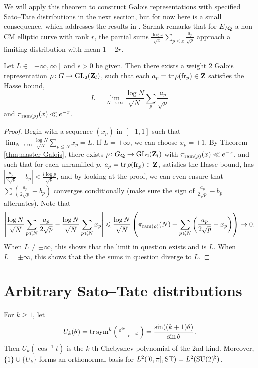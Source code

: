 We will apply this theorem to construct Galois representations with specified 
Sato--Tate distributions in the next section, but for now here is a small 
consequence, which addresses the results in \cite{sarnak-2007}. Sarnak remarks 
that for $E_{/\mathbf{Q}}$ a non-CM elliptic curve with rank $r$, the partial sums 
$\frac{\log x}{\sqrt x} \sum_{p\leqslant x} \frac{a_p}{\sqrt p}$ approach a 
limiting distribution with mean $1 - 2 r$. 

\begin{corollary}
Let $L \in [-\infty,\infty]$ and $\epsilon>0$ be given. Then there exists a 
weight 2 Galois representation $\rho\colon G\to \operatorname{GL}_2(\mathbf{Z}_l)$, such that 
each $a_p = \operatorname{tr}\rho(\mathrm{fr}_p)\in \mathbf{Z}$ satisfies the Hasse bound, 
\[
	L = \lim_{N\to \infty} \frac{\log N}{\sqrt N}\sum_p \frac{a_p}{\sqrt p} 
\]
and $\pi_{\mathrm{ram}(\rho)}(x) \ll e^{-x}$. 
\end{corollary}
\begin{proof}
Begin with a sequence $(x_p)$ in $[-1,1]$ such that 
$\lim_{N\to \infty} \frac{\log N}{\sqrt N}\sum_{p\leqslant N} x_p = L$. If 
$L=\pm \infty$, we can choose $x_p = \pm 1$. By Theorem 
\ref{thm:master-Galois}, there exists $\rho\colon G_{\mathbf{Q}} \to \operatorname{GL}_2(\mathbf{Z}_l)$ with 
$\pi_{\mathrm{ram}(\rho)}(x) \ll e^{-x}$, and such that for each unramified $p$, 
$a_p = \operatorname{tr}\rho(\mathrm{fr}_p)\in \mathbf{Z}$, satisfies the Hasse bound, has 
$\left| \frac{a_p}{2\sqrt p} - b_p\right| < \frac{l \log p}{\sqrt p}$, and by 
looking at the proof, we can even ensure that 
$\sum \left(\frac{a_p}{2\sqrt p} - b_p\right)$ converges conditionally (make 
sure the sign of $\frac{a_p}{2\sqrt p} - b_p$ alternates). Note that
\[
	\left|\frac{\log N}{\sqrt N}\sum_{p\leqslant N} \frac{a_p}{2\sqrt p} - \frac{\log N}{\sqrt N} \sum_{p\leqslant N} x_p\right| 
		\leqslant \frac{\log N}{\sqrt N} \left(\pi_{\mathrm{ram}(\rho)}(N) + \sum_{p\leqslant N} \left(\frac{a_p}{2 \sqrt p} - x_p\right)\right) \to 0 .
\]
When $L\ne \pm\infty$, this shows that the limit in question exists and is $L$. 
When $L=\pm \infty$, this shows that the the sums in question diverge to $L$. 
\end{proof}





\section{Arbitrary Sato--Tate distributions}

For $k\geqslant 1$, let 
\[
	U_k(\theta) = \operatorname{tr}\operatorname{sym}^k\left(\begin{smallmatrix} e^{i\theta} &  \\  & e^{- i \theta} \end{smallmatrix}\right) = \frac{\sin((k+1)\theta)}{\sin\theta} .
\]
Then $U_k(\cos^{-1} t)$ is the $k$-th Chebyshev polynomial of the 2nd kind. 
Moreover, $\{1\}\cup\{U_k\}$ forms an orthonormal basis for 
$L^2([0,\pi],\mathrm{ST}) = L^2(\operatorname{SU}(2)^\natural)$. 

